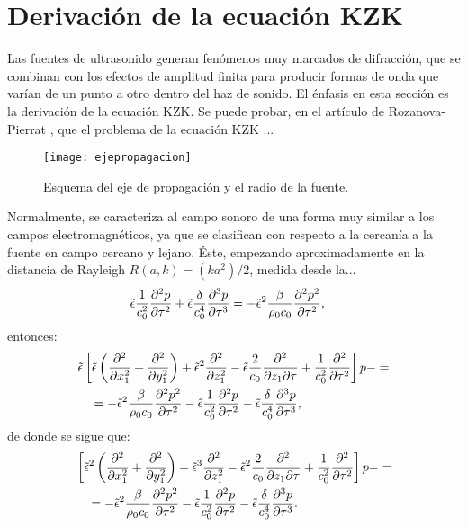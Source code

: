 \section{Derivación de la ecuación KZK} 
 Las fuentes de ultrasonido generan fenómenos muy marcados de difracción, que se combinan con los efectos de amplitud finita para producir formas de onda que varían de un punto a otro dentro del haz de sonido. El énfasis en esta sección es la derivación de la ecuación KZK. Se puede probar, en el artículo de Rozanova-Pierrat \cite{mathkzk}, que el problema de la ecuación KZK ...
\begin{figure}[hbpt]
\centering
\texttt{[image: ejepropagacion]}
\caption{Esquema del eje de propagación y el radio de la fuente.}
\label{fig:propagacion}
\end{figure}
Normalmente, se caracteriza al campo sonoro de una forma muy similar a los campos electromagnéticos, ya que se clasifican con respecto a la cercanía a la fuente en campo cercano y lejano. Éste, empezando aproximadamente en la distancia de Rayleigh $R(a,k) = (ka^2)\slash2$, medida desde la...
\begin{align*}
& \tilde{\epsilon}\frac{1}{c_0^2}\frac{\partial^2p}{\partial \tau^2} +\tilde{\epsilon}\frac{\delta}{c_0^4}\frac{\partial^3p}{\partial \tau^3}  = -\tilde{\epsilon}^2\frac{\beta}{\rho_0c_0}\frac{\partial^2p^2}{\partial \tau^2}\text{,}
\end{align*}
entonces:
\begin{align*}
&\tilde{\epsilon}\left[ \tilde{\epsilon}\left(\frac{\partial^2}{\partial x_1^2} +\frac{\partial^2}{\partial y_1^2}\right) + \tilde{\epsilon}^2 \frac{\partial^2}{\partial z_1^2} - \tilde{\epsilon}\frac{2}{c_0} \frac{\partial^2}{\partial z_1\partial \tau} +\frac{1}{c_0^2}\frac{\partial^2}{\partial \tau^2}\right]p - = \\
&\quad=-\tilde{\epsilon}^2\frac{\beta}{\rho_0c_0}\frac{\partial^2p^2}{\partial \tau^2}-\tilde{\epsilon}\frac{1}{c_0^2}\frac{\partial^2p}{\partial \tau^2} - \tilde{\epsilon}\frac{\delta}{c_0^4}\frac{\partial^3p}{\partial \tau^3}\text{,}
\end{align*}
de donde se sigue que:
\begin{align*}
&\left[\tilde{\epsilon}^2\left( \frac{\partial^2}{\partial x_1^2}+\frac{\partial^2}{\partial y_1^2}\right) + \tilde{\epsilon}^3\frac{\partial^2}{\partial z_1^2} - \tilde{\epsilon}^2 \frac{2}{c_0}\frac{\partial^2}{\partial z_1\partial \tau} +\frac{1}{c_0^2}\frac{\partial^2}{\partial \tau^2}\right]p - = \\
&\quad = -\tilde{\epsilon}^2\frac{\beta}{\rho_0 c_0}\frac{\partial^2p^2}{\partial \tau^2} - \tilde{\epsilon}\frac{1}{c_0^2}\frac{\partial^2p}{\partial \tau^2} -\tilde{\epsilon}\frac{\delta}{c_0^4}\frac{\partial^3p}{\partial \tau^3}\text{.}
\end{align*}
